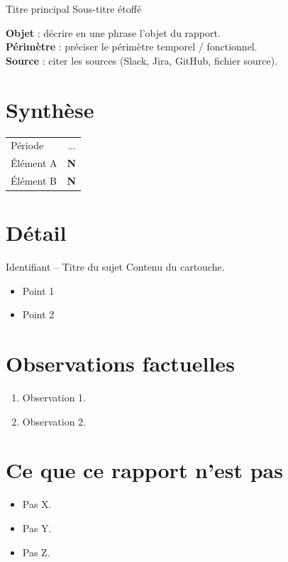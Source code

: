 \documentclass[11pt,a4paper]{article}
\begin{document}
\makeTealTitle
  {Titre principal}
  {Sous-titre étoffé}
  {\noindent\begin{infobox}
   \sffamily
   \textbf{\large Objet} : décrire en une phrase l'objet du rapport.\\[4pt]
   \textbf{Périmètre} : préciser le périmètre temporel / fonctionnel.\\[4pt]
   \textbf{Source} : citer les sources (Slack, Jira, GitHub, fichier source).
  \end{infobox}}

\section*{Synthèse}

\begin{infobox}[title=Chiffres clés,coltitle=white,colbacktitle=tealPrimary,
                fonttitle=\bfseries\sffamily]
\sffamily
\begin{tabular}{@{}l@{\hspace{2em}}r@{}}
Période            & ... \\
Élément A          & \textbf{N} \\
Élément B          & \textbf{N} \\
\end{tabular}
\end{infobox}

\section*{Détail}

\begin{ticketbox}{Identifiant -- Titre du sujet}
Contenu du cartouche.
\begin{itemize}
\item Point 1
\item Point 2
\end{itemize}
\end{ticketbox}

\section*{Observations factuelles}

\begin{infobox}
\sffamily
\begin{enumerate}[leftmargin=*]
\item Observation 1.
\item Observation 2.
\end{enumerate}
\end{infobox}

\section*{Ce que ce rapport n'est pas}

\begin{itemize}
\item Pas X.
\item Pas Y.
\item Pas Z.
\end{itemize}
\end{document}
